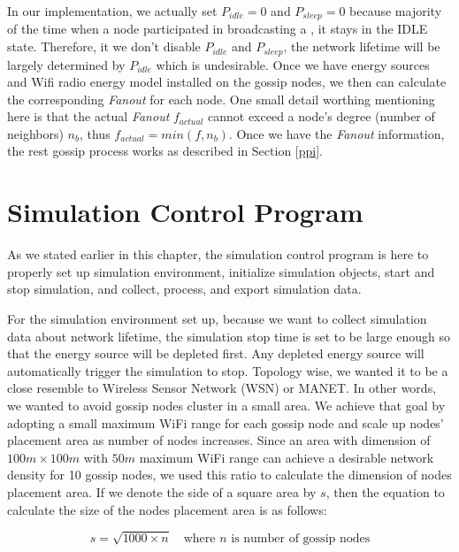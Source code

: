 In our implementation, we actually set $P_{idle}=0$ and $P_{sleep}=0$ because majority of the time when a node participated in broadcasting a \msg, it stays in the IDLE state. Therefore, it we don't disable $P_{idle}$ and $P_{sleep}$, the network lifetime will be largely determined by $P_{idle}$ which is undesirable. Once we have energy sources and Wifi radio energy model installed on the gossip nodes, we then can calculate the corresponding \emph{Fanout} for each node. One small detail worthing mentioning here is that the actual \emph{Fanout} $f_{actual}$ cannot exceed a node's degree (number of neighbors) $n_b$, thus $f_{actual} = min(f, n_b)$. Once we have the \emph{Fanout} information, the rest gossip process works as described in Section \ref{ppi}.

\section{Simulation Control Program}

As we stated earlier in this chapter, the simulation control program is here to properly set up simulation environment, initialize simulation objects, start and stop simulation, and collect, process, and export simulation data.

For the simulation environment set up, because we want to collect simulation data about network lifetime, the simulation stop time is set to be large enough so that the energy source will be depleted first. Any depleted energy source will automatically trigger the simulation to stop. Topology wise, we wanted it to be a close resemble to Wireless Sensor Network (WSN) or MANET. In other words, we wanted to avoid gossip nodes cluster in a small area. We achieve that goal by adopting a small maximum WiFi range for each gossip node and scale up nodes' placement area as number of nodes increases. Since an area with dimension of $100m \times 100m$ with $50m$ maximum WiFi range can achieve a desirable network density for 10 gossip nodes, we used this ratio to calculate the dimension of nodes placement area. If we denote the side of a square area by $s$, then the equation to calculate the size of the nodes placement area is as follows:

\[ s=\sqrt{1000\times n} \quad \mbox{where } n \mbox{ is number of gossip nodes}\]

